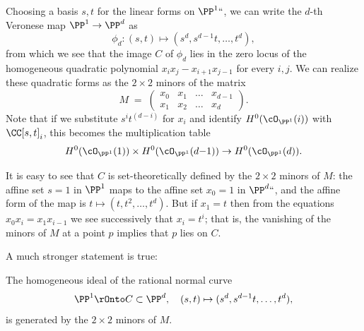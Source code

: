 Choosing a basis $s,t$ for the linear forms on $\PP^1` `$, we can
write the $d$-th 
%
Veronese map $\PP^{1}\to \PP^{d}$ as
$$
\phi_d : (s,t) \mapsto (s^d, s^{d-1}t,\dots, t^d)
,
$$
from which we see that the image $C$ of $\phi_d$ lies in the zero locus of the homogeneous quadratic polynomial $x_i x_j - x_{i+1}x_{j-1}$ for every $i,j$. We can realize these quadratic forms as the $2\times 2$ minors of the matrix
$$
M \; = \; \begin{pmatrix}
x_0 & x_1 & \dots & x_{d-1} \\
x_1 & x_2 & \dots & x_d
\end{pmatrix}.
$$
Note that if we substitute $s^it^{(d-i)}$ for $x_i$ and identify $H^0(\cO_{\PP^1}(i))$ with $\CC[s,t]_i$, this becomes the multiplication table
$$
H^0(\cO_{\PP^1}(1)) \times H^0(\cO_{\PP^1}(d{-}1)) \to H^0(\cO_{\PP^1}(d)).
$$


It is easy to see that $C$ is 
set-theoretically 
%
%
defined by the $2\times 2$ minors of $M$: the affine set $s=1$ in $\PP^1$ maps
to the affine set $x_0 = 1$ in $\PP^d` `$, and the affine form of the map is $t \mapsto (t, t^2, \dots, t^d)$. But if $x_1 = t$ then from 
the equations $x_0x_i = x_1x_{i-1}$ we see successively that $x_i = t^i$; 
that is, the vanishing of the minors of $M$ at a point $p$
implies that $p$ lies on $C$.

A much stronger statement is true:

\begin{proposition}\label{RNC generators} The homogeneous ideal of the
rational normal curve
%
$$
\PP^1 \rOnto C \subset \PP^d,\quad (s,t) \mapsto (s^d, s^{d-1}t, \dots, t^d),
$$ 
 is generated by the
 $2\times 2$ minors of $M$.
  \end{proposition}
  
% 
 
